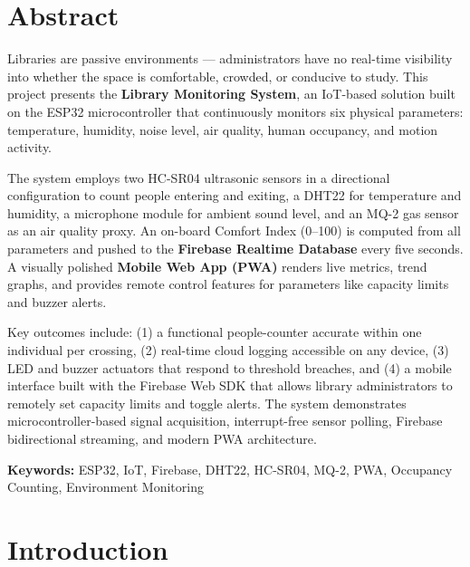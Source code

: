 \documentclass[12pt,a4paper]{article}
\begin{document}
\newpage

\section*{Abstract}

Libraries are passive environments — administrators have no real-time visibility into whether the space is comfortable, crowded, or conducive to study. This project presents the \textbf{Library Monitoring System}, an IoT-based solution built on the ESP32 microcontroller that continuously monitors six physical parameters: temperature, humidity, noise level, air quality, human occupancy, and motion activity.

The system employs two HC-SR04 ultrasonic sensors in a directional configuration to count people entering and exiting, a DHT22 for temperature and humidity, a microphone module for ambient sound level, and an MQ-2 gas sensor as an air quality proxy. An on-board Comfort Index (0–100) is computed from all parameters and pushed to the \textbf{Firebase Realtime Database} every five seconds. A visually polished \textbf{Mobile Web App (PWA)} renders live metrics, trend graphs, and provides remote control features for parameters like capacity limits and buzzer alerts.

Key outcomes include: (1) a functional people-counter accurate within one individual per crossing, (2) real-time cloud logging accessible on any device, (3) LED and buzzer actuators that respond to threshold breaches, and (4) a mobile interface built with the Firebase Web SDK that allows library administrators to remotely set capacity limits and toggle alerts. The system demonstrates microcontroller-based signal acquisition, interrupt-free sensor polling, Firebase bidirectional streaming, and modern PWA architecture.

\vspace{0.3cm}
\noindent\textbf{Keywords:} ESP32, IoT, Firebase, DHT22, HC-SR04, MQ-2, PWA, Occupancy Counting, Environment Monitoring

\newpage

\tableofcontents
\newpage

\section{Introduction}
\end{document}
